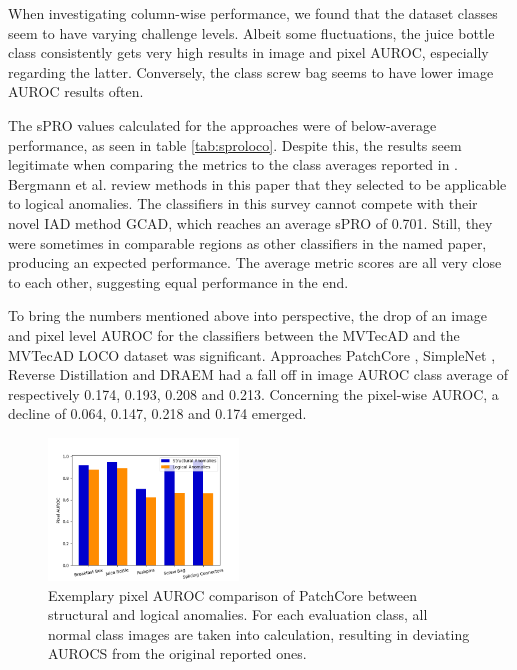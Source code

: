 

When investigating column-wise performance, we found that the dataset classes seem to have varying challenge levels. Albeit some fluctuations, 
the juice bottle class consistently gets very high results in image and pixel AUROC, especially regarding the latter. 
Conversely, the class screw bag seems to have lower image AUROC results often.




The sPRO values calculated for the approaches were of below-average performance, as seen in table \ref{tab:sproloco}. Despite this, the results seem legitimate when comparing the metrics to the 
class averages reported in \cite{LOCODentsAndScratchesBergmann2022}. Bergmann et al. review methods 
in this paper that they selected to be applicable to logical anomalies. The classifiers in this survey cannot compete with their novel IAD method GCAD, which reaches an 
average sPRO of 0.701. Still, they were sometimes in comparable regions as other classifiers in the named paper, producing an expected performance. 
The average metric scores are all very close to each other, suggesting equal performance in the end.





To bring the numbers mentioned above into perspective, the drop of an image and pixel level AUROC for the classifiers between the 
MVTecAD \cite{MVTEC_Bergmann_2021} and the MVTecAD LOCO \cite{LOCODentsAndScratchesBergmann2022} dataset was significant. Approaches 
PatchCore \cite{patchCore2022}, SimpleNet \cite{liu2023simplenet}, Reverse Distillation \cite{revdist2023} and DRAEM \cite{Zavrtanik_2021DRAEM} had a fall off 
in image AUROC class average of respectively 0.174, 0.193, 0.208 and 0.213. Concerning the pixel-wise 
AUROC, a decline of 0.064, 0.147, 0.218 and 0.174 emerged. \newline


\begin{figure}[H]
    \centering
    \includegraphics[width=0.45\textwidth]{figures/structvslogic.png}
    \caption{Exemplary pixel AUROC comparison of PatchCore \cite{patchCore2022} between structural and logical anomalies. For each evaluation class, all normal class images 
             are taken into calculation, resulting in deviating AUROCS from the original reported ones.}
    \label{fig:structvslogic}
\end{figure}

